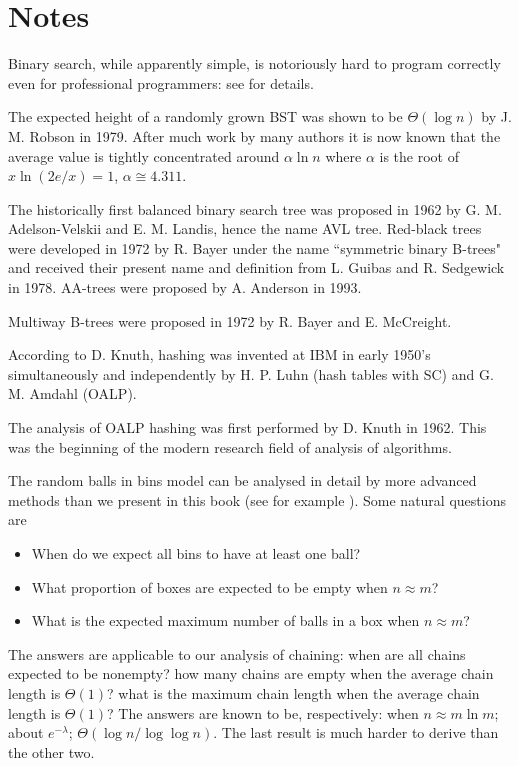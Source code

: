 \section{Notes}

Binary search, while apparently simple, is notoriously hard to program 
correctly even for professional programmers: see \cite{bentley-prog-pearls} 
for details.

The expected height of a randomly grown BST was shown to be $\Theta(\log n)$ by 
J. M. Robson in 1979. After much work by many authors 
it is now known that the average value is 
tightly concentrated around $\alpha \ln n$ where $\alpha$ is the root of 
$x \ln (2e/x) = 1$, $\alpha \cong 4.311$.  

The historically first balanced binary search tree was
proposed in 1962 by G. M. Adelson-Velskii and E. M. Landis, hence the 
name AVL tree. Red-black trees were developed in 1972 by R. Bayer under the 
name ``symmetric binary B-trees" and received their present name and definition 
from L. Guibas and R. Sedgewick in 1978. AA-trees were proposed by A. Anderson 
in 1993.

Multiway B-trees were proposed in 1972 by R. Bayer and E. McCreight. 

According to D. Knuth, hashing was invented at IBM in early 1950's 
simultaneously and independently by H. P. Luhn (hash tables with SC) and 
G. M. Amdahl (OALP). 

The analysis of OALP hashing was first performed by D. Knuth in 1962. This was 
the beginning of the modern research field of analysis of algorithms.

The random balls in bins model can be analysed in detail by more advanced methods
than we present in this book (see for example \cite{flaj-sedg}). Some natural questions are
\begin{itemize}
\item When do we expect all bins to have at least one ball?
\item What proportion of boxes are expected to be empty when $n \approx m$?
\item What is the expected maximum number of balls in a box when $n \approx m$?
\end{itemize}
The answers are applicable to our analysis of chaining: when are all chains 
expected to be nonempty? how many chains are empty when the average chain 
length is $\Theta(1)$? what is the maximum chain length when the average chain
length is $\Theta(1)$? The answers are known to be, respectively: when 
$n \approx m \ln m$; about $e^{-\lambda}$; $\Theta(\log n/\log \log n)$. The last
result is much harder to derive than the other two.  
